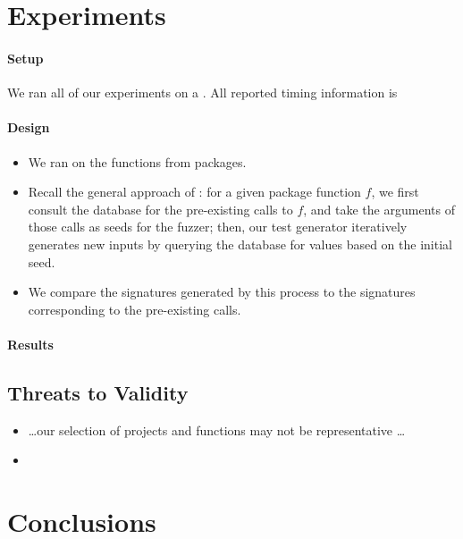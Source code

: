 \documentclass[sigplan,anonymous,review]{acmart}
\begin{document}
\section{Experiments}
\label{sec:experiments}

\paragraph{Setup} 
We ran all of our experiments on a .
All reported timing information is 

\paragraph{Design}
\begin{itemize}
    \item We ran \tool on the   functions from  packages.
    \item Recall the general approach of \tool: for a given package function $f$, we first consult the database for the pre-existing calls to $f$, and take the arguments of those calls as seeds for the fuzzer; then, our test generator iteratively generates new inputs by querying the database for values based on the initial seed.
    \item We compare the signatures generated by this process to the signatures corresponding to the pre-existing calls.
\end{itemize}

\paragraph{Results}

\subsection{Threats to Validity}

\begin{itemize}
    \item \ldots our selection of projects and functions may not be representative \ldots
    \item {}
\end{itemize}

\section{Conclusions}
\label{sec:conclusions}
\end{document}
